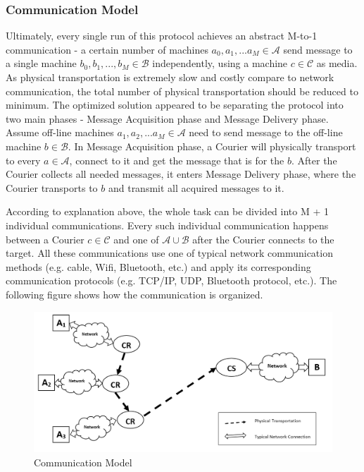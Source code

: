 \documentclass[10pt,a4paper]{article}
\begin{document}
\subsubsection*{Communication Model}
Ultimately, every single run of this protocol achieves an abstract M-to-1 communication - a certain number of machines $a_0, a_1, ... a_M \in \mathcal{A}$ send message to a single machine $b_0, b_1, ..., b_M \in \mathcal{B}$ independently, using a machine $c \in \mathcal{C}$ as media. As physical transportation is extremely slow and costly compare to network communication, the total number of physical transportation should be reduced to minimum. The optimized solution appeared to be separating the protocol into two main phases - Message Acquisition phase and Message Delivery phase. Assume off-line machines $a_1, a_2, ... a_M \in \mathcal{A}$ need to send message to the off-line machine $b \in \mathcal{B}$. In Message Acquisition phase, a Courier will physically transport to every $a \in \mathcal{A}$, connect to it and get the message that is for the $b$. After the Courier collects all needed messages, it enters Message Delivery phase, where the Courier transports to $b$ and transmit all acquired messages to it.

According to explanation above, the whole task can be divided into M + 1 individual communications. Every such individual communication happens between a Courier $c \in \mathcal{C}$ and one of $\mathcal{A} \cup \mathcal{B}$ after the Courier connects to the target. All these communications use one of typical network communication methods (e.g. cable, Wifi, Bluetooth, etc.) and apply its corresponding communication protocols (e.g. TCP/IP, UDP, Bluetooth protocol, etc.). The following figure shows how the communication is organized.

\begin{figure}[h!]
\includegraphics[width=\textwidth,natwidth=1123,natheight=530]{communicationmodel.png}
\caption{Communication Model}
\end{figure}
\end{document}
